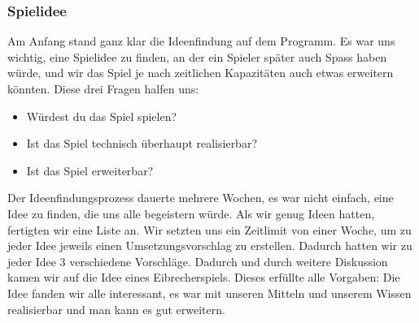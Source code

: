\documentclass[12pt,a4paper]{scrartcl}
\begin{document}
\subsubsection{Spielidee}
Am Anfang stand ganz klar die Ideenfindung auf dem Programm. Es war uns wichtig,
eine Spielidee zu finden, an der ein Spieler später auch Spass haben würde,
und wir das Spiel je nach zeitlichen Kapazitäten auch etwas erweitern könnten.
Diese drei Fragen halfen uns:
\begin{itemize}
\item Würdest du das Spiel spielen?
\item Ist das Spiel technisch überhaupt realisierbar?
\item Ist das Spiel erweiterbar?
\end{itemize}
Der Ideenfindungsprozess dauerte mehrere Wochen, es war nicht einfach, eine Idee
zu finden, die uns alle begeistern würde. 
Als wir genug Ideen hatten, fertigten wir eine Liste an. 
Wir setzten uns ein Zeitlimit von einer Woche, um zu jeder Idee jeweils einen Umsetzungsvorschlag zu erstellen. 
Dadurch hatten wir zu jeder Idee 3 verschiedene Vorschläge.
Dadurch und durch weitere Diskussion kamen wir auf die Idee eines Eibrecherspiels.
Dieses erfüllte alle Vorgaben:
Die Idee fanden wir alle interessant, es war mit unseren Mitteln und unserem Wissen realisierbar und man kann es gut erweitern.
\end{document}
